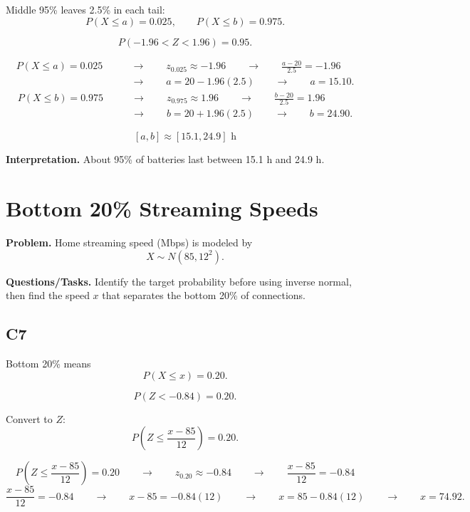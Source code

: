 	Middle 95\% leaves 2.5\% in each tail:
	\[
	P(X \leq a) = 0.025, \qquad P(X \leq b) = 0.975.
	\]
	
	\[
	P(-1.96<Z<1.96)=0.95.
	\]
	
	
	\[
	\begin{aligned}
	P(X \leq a)=0.025
	&\qquad \longrightarrow \qquad z_{0.025}\approx -1.96
	\qquad \longrightarrow \qquad \frac{a-20}{2.5}=-1.96\\
	&\qquad \longrightarrow \qquad a=20-1.96(2.5)
	\qquad \longrightarrow \qquad a=15.10.
	\end{aligned}
	\]
	\[
	\begin{aligned}
	P(X \leq b)=0.975
	&\qquad \longrightarrow \qquad z_{0.975}\approx 1.96
	\qquad \longrightarrow \qquad \frac{b-20}{2.5}=1.96\\
	&\qquad \longrightarrow \qquad b=20+1.96(2.5)
	\qquad \longrightarrow \qquad b=24.90.
	\end{aligned}
	\]
	
	\[
	[a,b] \approx [15.1, 24.9]\text{ h}
	\]
	
	\textbf{Interpretation.} About 95\% of batteries last between 15.1 h and 24.9 h.
	
	\section{Bottom 20\% Streaming Speeds}
	
	\textbf{Problem.} Home streaming speed (Mbps) is modeled by
	\[
	X \sim N(85, 12^2).
	\]
	
	\textbf{Questions/Tasks.} Identify the target probability before using inverse normal, then find the speed $x$ that separates the bottom 20\% of connections.
	
	\subsection*{C7}
	
	Bottom 20\% means
	\[
	P(X \leq x) = 0.20.
	\]
	
	\[
	P(Z<-0.84)=0.20.
	\]
	
	
	Convert to $Z$:
	\[
	P\left(Z \leq \frac{x - 85}{12}\right) = 0.20.
	\]
	
	\[
	P\left(Z \leq \frac{x - 85}{12}\right)=0.20
	\qquad \longrightarrow \qquad
	z_{0.20}\approx -0.84
	\qquad \longrightarrow \qquad
	\frac{x - 85}{12}=-0.84
	\]
	\[
	\frac{x - 85}{12}=-0.84
	\qquad \longrightarrow \qquad
	x-85=-0.84(12)
	\qquad \longrightarrow \qquad
	x=85-0.84(12)
	\qquad \longrightarrow \qquad
	x=74.92.
	\]
	
